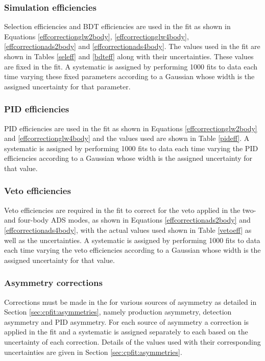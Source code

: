 \subsubsection{Simulation efficiencies}

Selection efficiencies and BDT efficiencies are used in the \CP fit as shown in Equations \ref{effcorrectionglw2body}, \ref{effcorrectionglw4body}, \ref{effcorrectionads2body} and \ref{effcorrectionads4body}. The values used in the \CP fit are shown in Tables \ref{seleff} and \ref{bdteff} along with their uncertainties. These values are fixed in the \CP fit. A systematic is assigned by performing 1000 fits to data each time varying these fixed parameters according to a Gaussian whose width is the assigned uncertainty for that parameter.

\subsubsection{PID efficiencies}

PID efficiencies are used in the \CP fit as shown in Equations \ref{effcorrectionglw2body} and \ref{effcorrectionglw4body} and the values used are shown in Table \ref{pideff}. A systematic is assigned by performing 1000 fits to data each time varying the PID efficiencies according to a Gaussian whose width is the assigned uncertainty for that value.

\subsubsection{Veto efficiencies}

Veto efficiencies are required in the \CP fit to correct for the veto applied in the two- and four-body ADS modes, as shown in Equations \ref{effcorrectionads2body} and \ref{effcorrectionads4body}, with the actual values used shown in Table \ref{vetoeff} as well as the uncertainties. A systematic is assigned by performing 1000 fits to data each time varying the veto efficiencies according to a Gaussian whose width is the assigned uncertainty for that value.

\subsubsection{Asymmetry corrections}

Corrections must be made in the \CP for various sources of asymmetry as detailed in Section \ref{sec:cpfit:asymmetries}, namely production asymmetry, detection asymmetry and PID asymmetry. For each source of asymmetry a correction is applied in the \CP fit and a systematic is assigned separately to each based on the uncertainty of each correction. Details of the values used with their corresponding uncertainties are given in Section \ref{sec:cpfit:asymmetries}.

